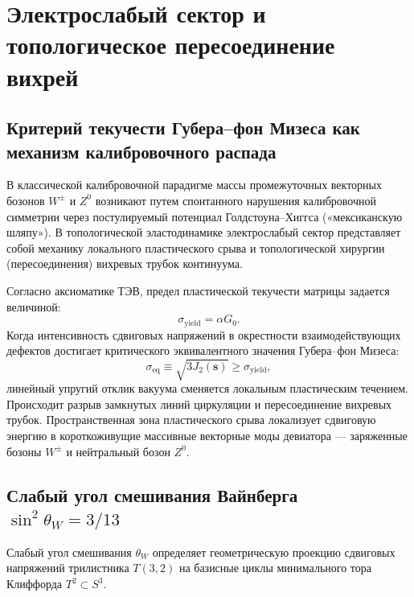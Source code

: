\documentclass[11pt,a4paper]{article}
\theoremstyle{definition}
\theoremstyle{remark}
\begin{document}

\section{Электрослабый сектор и топологическое пересоединение вихрей}
\label{sec:electroweak}

\subsection{Критерий текучести Губера--фон Мизеса как механизм калибровочного распада}
В классической калибровочной парадигме массы промежуточных векторных бозонов $W^\pm$ и $Z^0$ возникают путем спонтанного нарушения калибровочной симметрии через постулируемый потенциал Голдстоуна--Хиггса («мексиканскую шляпу»). В топологической эластодинамике электрослабый сектор представляет собой механику локального пластического срыва и топологической хирургии (пересоединения) вихревых трубок континуума.

Согласно аксиоматике ТЭВ, предел пластической текучести матрицы задается величиной:
\begin{equation}
    \sigma_{\mathrm{yield}} = \alpha G_0.
    \label{eq:yield_stress_limit}
\end{equation}
Когда интенсивность сдвиговых напряжений в окрестности взаимодействующих дефектов достигает критического эквивалентного значения Губера--фон Мизеса:
\begin{equation}
    \sigma_{\mathrm{eq}} \equiv \sqrt{3 J_2(\mathbf{s})} \ge \sigma_{\mathrm{yield}},
\end{equation}
линейный упругий отклик вакуума сменяется локальным пластическим течением. Происходит разрыв замкнутых линий циркуляции и пересоединение вихревых трубок. Пространственная зона пластического срыва локализует сдвиговую энергию в короткоживущие массивные векторные моды девиатора --- заряженные бозоны $W^\pm$ и нейтральный бозон $Z^0$.

\subsection{Слабый угол смешивания Вайнберга $\sin^2\theta_W = 3/13$}
Слабый угол смешивания $\theta_W$ определяет геометрическую проекцию сдвиговых напряжений трилистника $T(3,2)$ на базисные циклы минимального тора Клиффорда $T^2 \subset S^3$.
\end{document}
